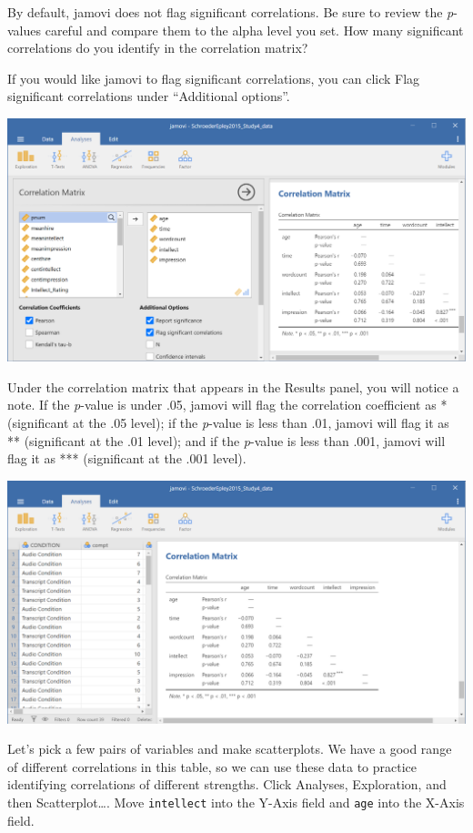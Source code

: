 \documentclass[
]{book}
\begin{document}
By default, jamovi does not flag significant correlations. Be sure to review the \emph{p}-values careful and compare them to the alpha level you set. How many significant correlations do you identify in the correlation matrix?

If you would like jamovi to flag significant correlations, you can click {Flag significant correlations} under ``Additional options''.

\includegraphics{img/7.4.66.png}

Under the correlation matrix that appears in the Results panel, you will notice a note. If the \emph{p}-value is under .05, jamovi will flag the correlation coefficient as * (significant at the .05 level); if the \emph{p}-value is less than .01, jamovi will flag it as ** (significant at the .01 level); and if the \emph{p}-value is less than .001, jamovi will flag it as *** (significant at the .001 level).

\includegraphics{img/7.4.67.png}

Let's pick a few pairs of variables and make scatterplots. We have a good range of different correlations in this table, so we can use these data to practice identifying correlations of different strengths. Click {Analyses}, {Exploration}, and then {Scatterplot\ldots{}}. Move \texttt{intellect} into the Y-Axis field and \texttt{age} into the X-Axis field.
\end{document}
